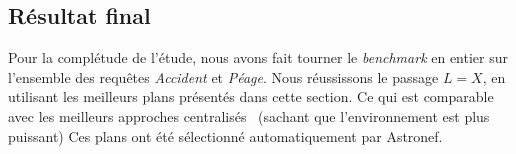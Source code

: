 \subsection{Résultat final}
Pour la complétude de l'étude, nous avons fait tourner le \textit{benchmark} en entier sur l'ensemble des requêtes \textit{Accident} et \textit{Péage}. Nous réussissons le passage $L=X$, en utilisant les meilleurs plans présentés dans cette section. Ce qui est comparable avec les meilleurs approches centralisés~\cite{Zeitler:massive} (sachant que l'environnement est plus puissant) Ces plans ont été sélectionné automatiquement par Astronef.